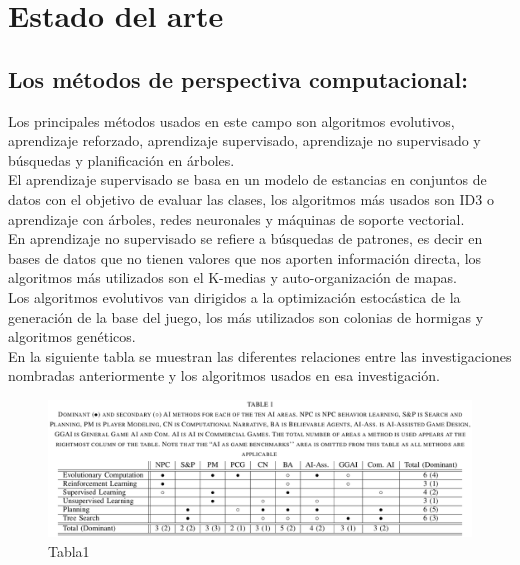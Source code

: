 \chapter[Estado del arte]{\label{identificadorReferenciaCruzada}
Estado del arte}

\section{Los métodos de perspectiva computacional:}

Los principales métodos usados en este campo son algoritmos evolutivos, aprendizaje reforzado, aprendizaje supervisado, aprendizaje no supervisado y búsquedas y planificación en árboles.\\

El aprendizaje supervisado se basa en un modelo de estancias en conjuntos de datos con el objetivo de evaluar las clases, los algoritmos más usados son ID3 o aprendizaje con árboles, redes neuronales y máquinas de soporte vectorial.\\
	
En aprendizaje no supervisado se refiere a búsquedas de patrones, es decir en bases de datos que no tienen valores que nos aporten información directa, los algoritmos más utilizados son el K-medias y auto-organización de mapas.\\

Los algoritmos evolutivos van dirigidos a la optimización estocástica de la generación de la base del juego, los más utilizados son colonias de hormigas y algoritmos genéticos.\\

En la siguiente tabla se muestran las diferentes relaciones entre las investigaciones nombradas anteriormente y los algoritmos usados en esa investigación.\\


\begin{figure}[htb]
  \centering
    \includegraphics[width=15cm]{./eps/tabla1.eps}
    \vspace{2cm}
  \caption{Tabla1}
  \label{fig:ejemplo}
\end{figure}

